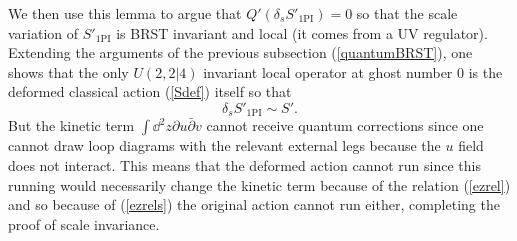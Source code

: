 \documentclass[12pt]{article}
\def\be{\begin{equation}}
\def\ee{\end{equation}}
\numberwithin{equation}{section}
\begin{document}
We then use this lemma to argue that $Q'(\delta_s S'_{\text{1PI}}) = 0$ so that the scale variation of $S'_{\text{1PI}}$ is BRST invariant and local (it comes from a UV regulator). Extending the arguments of the previous subsection (\ref{quantumBRST}), one shows that the only $U(2,2|4)$ invariant local operator at ghost number 0 is the deformed classical action (\ref{Sdef}) itself so that
\be
\delta_s S'_{\text{1PI}} \sim S'.
\label{ezrel}
\ee
But the kinetic term $\int \dd^2z \partial u \bar{\partial} v$ cannot receive quantum corrections since one cannot draw loop diagrams with the relevant external legs because the $u$ field does not interact. This means that the deformed action cannot run since this running would necessarily change the kinetic term because of the relation (\ref{ezrel}) and so because of (\ref{ezrels}) the original action cannot run either, completing the proof of scale invariance.
\end{document}
